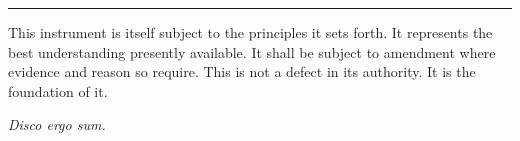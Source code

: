 \documentclass[12pt, a4paper]{article}
\begin{document}
\vspace{1.2em}

\begin{center}
  \rule{4cm}{0.4pt}
\end{center}

\vspace{1.2em}

\noindent
This instrument is itself subject to the principles it sets forth.
It represents the best understanding presently available.
It shall be subject to amendment where evidence and reason so require.
This is not a defect in its authority. It is the foundation of it.

\vspace{2em}

\begin{center}
  {\small\itshape Disco ergo sum.}
\end{center}
\end{document}
